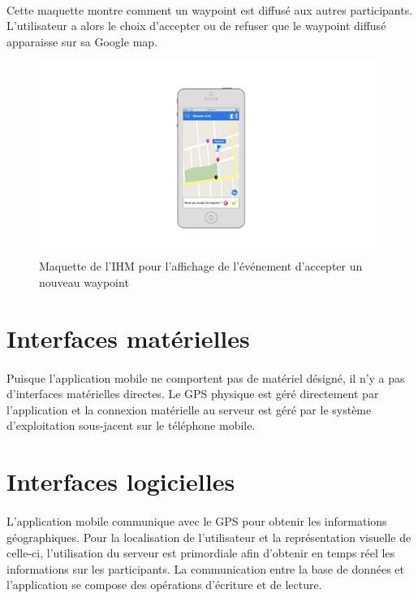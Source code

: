 \documentclass[titlepage, 12pt]{report}
\begin{document}
\clearpage

\paragraph{}Cette maquette montre comment un waypoint est diffusé aux autres participants. L'utilisateur a alors le choix d'accepter ou de refuser que le waypoint diffusé apparaisse sur sa Google map.

\begin{figure}[!h]
	\caption{Maquette de l'IHM pour l'affichage de l'événement d'accepter un nouveau waypoint}
	\label{accept_waypoint}
	\centering
	\includegraphics[scale=0.3]{images/mockups/accept_waypoint.png}
\end{figure}

\clearpage

\section{Interfaces matérielles}

\paragraph{}Puisque l'application mobile ne comportent pas de matériel désigné, il n'y a pas d'interfaces matérielles directes. Le GPS physique est géré directement par l'application et la connexion matérielle au serveur est géré par le système d'exploitation sous-jacent sur le téléphone mobile. 

\section{Interfaces logicielles}

\paragraph{}L'application mobile communique avec le GPS pour obtenir les informations géographiques. Pour la localisation de l'utilisateur et la représentation visuelle de celle-ci, l'utilisation du serveur est primordiale afin d'obtenir en temps réel les informations sur les participants.
La communication entre la base de données et l'application se compose des opérations d'écriture et de lecture.
\end{document}
